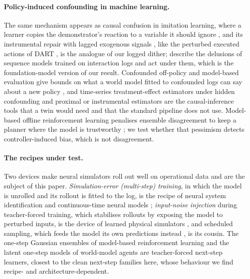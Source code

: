 \documentclass[11pt]{article}
\begin{document}
\paragraph{Policy-induced confounding in machine learning.} The same mechanism appears as causal confusion in imitation learning, where a learner copies the demonstrator's reaction to a variable it should ignore \citep{dehaan2019}, and its instrumental repair with lagged exogenous signals \citep{swamy2022}, like the perturbed executed actions of DART \citep{laskey2017dart}, is the analogue of our logged dither; \citet{ortega2021} describe the delusions of sequence models trained on interaction logs and act under them, which is the foundation-model version of our result. Confounded off-policy and model-based evaluation give bounds on what a world model fitted to confounded logs can say about a new policy \citep{tennenholtz2020,namkoong2020,brunssmith2021,shi2022}, and time-series treatment-effect estimators under hidden confounding \citep{bica2020,melnychuk2022} and proximal or instrumental estimators \citep{hartford2017,rothenhausler2021} are the causal-inference tools that a twin would need and that the standard pipeline does not use. Model-based offline reinforcement learning penalises ensemble disagreement to keep a planner where the model is trustworthy \citep{yu2020mopo,kidambi2020morel}; we test whether that pessimism detects controller-induced bias, which is not disagreement.

\paragraph{The recipes under test.} Two devices make neural simulators roll out well on operational data and are the subject of this paper. \emph{Simulation-error (multi-step) training}, in which the model is unrolled and its rollout is fitted to the log, is the recipe of neural system identification and continuous-time neural models \citep{forgione2021,beintema2021}; \emph{input-noise injection} during teacher-forced training, which stabilises rollouts by exposing the model to perturbed inputs, is the device of learned physical simulators \citep{sanchez2020gns,pfaff2021meshgraphnets}, and scheduled sampling, which feeds the model its own predictions instead \citep{bengio2015scheduled}, is its cousin. The one-step Gaussian ensembles of model-based reinforcement learning \citep{chua2018pets,janner2019mbpo,yu2020mopo} and the latent one-step models of world-model agents \citep{hafner2020dreamer} are teacher-forced next-step learners, closest to the clean next-step families here, whose behaviour we find recipe- and architecture-dependent.
\end{document}
